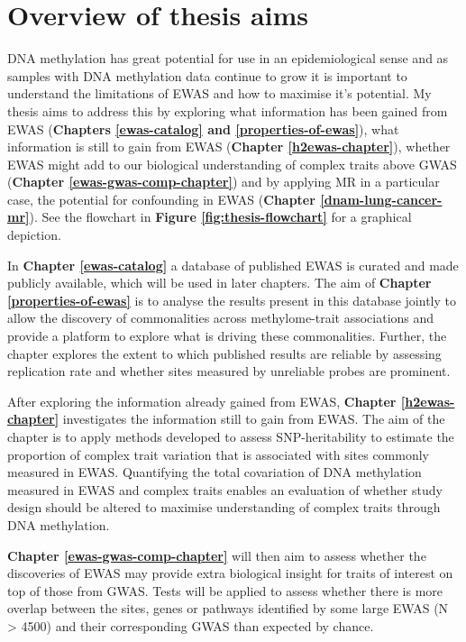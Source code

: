 \documentclass[11pt,oneside]{bristolthesis}
\begin{document}
\hypertarget{overview-of-thesis-aims}{%
\section{Overview of thesis aims}\label{overview-of-thesis-aims}}

DNA methylation has great potential for use in an epidemiological sense and as samples with DNA methylation data continue to grow it is important to understand the limitations of EWAS and how to maximise it's potential. My thesis aims to address this by exploring what information has been gained from EWAS (\textbf{Chapters \ref{ewas-catalog} and \ref{properties-of-ewas}}), what information is still to gain from EWAS (\textbf{Chapter \ref{h2ewas-chapter}}), whether EWAS might add to our biological understanding of complex traits above GWAS (\textbf{Chapter \ref{ewas-gwas-comp-chapter}}) and by applying MR in a particular case, the potential for confounding in EWAS (\textbf{Chapter \ref{dnam-lung-cancer-mr}}). See the flowchart in \textbf{Figure \ref{fig:thesis-flowchart}} for a graphical depiction.

In \textbf{Chapter \ref{ewas-catalog}} a database of published EWAS is curated and made publicly available, which will be used in later chapters. The aim of \textbf{Chapter \ref{properties-of-ewas}} is to analyse the results present in this database jointly to allow the discovery of commonalities across methylome-trait associations and provide a platform to explore what is driving these commonalities. Further, the chapter explores the extent to which published results are reliable by assessing replication rate and whether sites measured by unreliable probes are prominent.

After exploring the information already gained from EWAS, \textbf{Chapter \ref{h2ewas-chapter}} investigates the information still to gain from EWAS. The aim of the chapter is to apply methods developed to assess SNP-heritability to estimate the proportion of complex trait variation that is associated with sites commonly measured in EWAS. Quantifying the total covariation of DNA methylation measured in EWAS and complex traits enables an evaluation of whether study design should be altered to maximise understanding of complex traits through DNA methylation.

\textbf{Chapter \ref{ewas-gwas-comp-chapter}} will then aim to assess whether the discoveries of EWAS may provide extra biological insight for traits of interest on top of those from GWAS. Tests will be applied to assess whether there is more overlap between the sites, genes or pathways identified by some large EWAS (N \textgreater{} 4500) and their corresponding GWAS than expected by chance.
\end{document}
